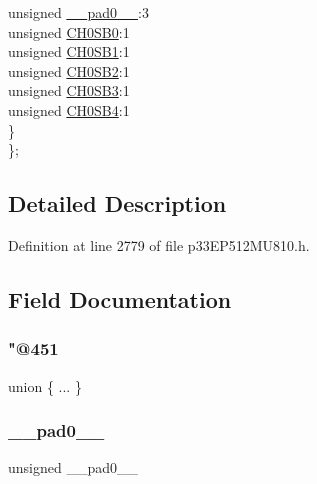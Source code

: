 \begin{DoxyCompactItemize}
\begin{tabbing}
\>\>unsigned \hyperlink{structtag_a_d2_c_h_s0_b_i_t_s_adf71f3d8410c1f1dbbc96680a92c49af}{\_\_pad0\_\_}:3\\
\>\>unsigned \hyperlink{structtag_a_d2_c_h_s0_b_i_t_s_aa9c32b5f5663d118afa09df2e2e2de08}{CH0SB0}:1\\
\>\>unsigned \hyperlink{structtag_a_d2_c_h_s0_b_i_t_s_a20fdb9b36c1ea4d133f87ed606c1cf4c}{CH0SB1}:1\\
\>\>unsigned \hyperlink{structtag_a_d2_c_h_s0_b_i_t_s_aa10291da07f490db16ef1d6a640b4c5d}{CH0SB2}:1\\
\>\>unsigned \hyperlink{structtag_a_d2_c_h_s0_b_i_t_s_a5c8a75088c6230c9b21151f9f86fb142}{CH0SB3}:1\\
\>\>unsigned \hyperlink{structtag_a_d2_c_h_s0_b_i_t_s_a4f65ab47f0d8e69cd9826d4a74fb614b}{CH0SB4}:1\\
\>\} \\
\}; \\

\end{tabbing}\end{DoxyCompactItemize}


\subsection{Detailed Description}


Definition at line 2779 of file p33\+E\+P512\+M\+U810.\+h.



\subsection{Field Documentation}
\mbox{\label{structtag_a_d2_c_h_s0_b_i_t_s_a4e258abd3d17fadc550eae07a52b4103}} 
\subsubsection{\texorpdfstring{"@451}{@451}}
{\footnotesize\ttfamily union \{ ... \} }

\mbox{\label{structtag_a_d2_c_h_s0_b_i_t_s_adf71f3d8410c1f1dbbc96680a92c49af}} 
\subsubsection{\texorpdfstring{\+\_\+\+\_\+pad0\+\_\+\+\_\+}{\_\_pad0\_\_}}
{\footnotesize\ttfamily unsigned \+\_\+\+\_\+pad0\+\_\+\+\_\+}



